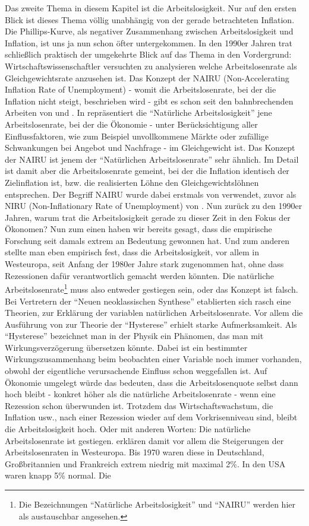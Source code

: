 Das zweite Thema in diesem Kapitel ist die Arbeitslosigkeit. Nur auf den ersten Blick ist dieses Thema völlig unabhängig von der gerade betrachteten Inflation. Die Phillips-Kurve, als negativer Zusammenhang zwischen Arbeitslosigkeit und Inflation, ist uns ja nun schon öfter untergekommen. In den 1990er Jahren trat schließlich praktisch der umgekehrte Blick auf das Thema in den Vordergrund: Wirtschaftswissenschaftler versuchten zu analysieren welche Arbeitslosenrate als Gleichgewichtsrate anzusehen ist. Das Konzept der NAIRU (Non-Accelerating Inflation Rate of Unemployment) - womit die Arbeitslosenrate, bei der die Inflation nicht steigt, beschrieben wird - gibt es schon seit den bahnbrechenden Arbeiten von \textcite{Friedman1968} und \textcite{Phelps1967}. In \textcite[S. 8]{Friedman1968} repräsentiert die "`Natürliche Arbeitslosigkeit"' jene Arbeitslosenrate, bei der die Ökonomie - unter Berücksichtigung aller Einflussfaktoren, wie zum Beispiel unvollkommene Märkte oder zufällige Schwankungen bei Angebot und Nachfrage - im Gleichgewicht ist. Das Konzept der NAIRU ist jenem der "`Natürlichen Arbeitslosenrate"' sehr ähnlich. Im Detail ist damit aber die Arbeitslosenrate gemeint, bei der die Inflation identisch der Zielinflation ist, bzw. die realisierten Löhne den Gleichgewichtslöhnen entsprechen. Der Begriff NAIRU wurde dabei erstmals von \textcite{Tobin1980} verwendet, zuvor als NIRU (Non-Inflationary Rate of Unemployment) von \textcite{Modigliani1975}. Nun zurück zu den 1990er Jahren, warum trat die Arbeitslosigkeit gerade zu dieser Zeit in den Fokus der Ökonomen? Nun zum einen haben wir bereits gesagt, dass die empirische Forschung seit damals extrem an Bedeutung gewonnen hat. Und zum anderen stellte man eben empirisch fest, dass die Arbeitslosigkeit, vor allem in Westeuropa, seit Anfang der 1980er Jahre stark zugenommen hat, ohne dass Rezessionen dafür verantwortlich gemacht werden könnten. Die natürliche Arbeitslosenrate\footnote{Die Bezeichnungen "`Natürliche Arbeitslosigkeit"' und "`NAIRU"' werden hier als austauschbar angesehen.} muss also entweder gestiegen sein, oder das Konzept ist falsch. Bei Vertretern der "`Neuen neoklassischen Synthese"' etablierten sich rasch eine Theorien, zur Erklärung der variablen natürlichen Arbeitslosenrate. Vor allem die Ausführung von \textcite{Blanchard1986} zur Theorie der "`Hysterese"' erhielt starke Aufmerksamkeit. Als "`Hysterese"' bezeichnet man in der Physik ein Phänomen, das man mit Wirkungsverzögerung übersetzen könnte. Dabei ist ein bestimmter Wirkungszusammenhang beim beobachten einer Variable noch immer vorhanden, obwohl der eigentliche verursachende Einfluss schon weggefallen ist. Auf Ökonomie umgelegt würde das bedeuten, dass die Arbeitslosenquote selbst dann hoch bleibt - konkret höher als die natürliche Arbeitslosenrate - wenn eine Rezession schon überwunden ist. Trotzdem das Wirtschaftswachstum, die Inflation usw., nach einer Rezession wieder auf dem Vorkrisenniveau sind, bleibt die Arbeitslosigkeit hoch. Oder mit anderen Worten: Die natürliche Arbeitslosenrate ist gestiegen. \textcite{Blanchard1986} erklären damit vor allem die Steigerungen der Arbeitslosenraten in Westeuropa. Bis 1970 waren diese in Deutschland, Großbritannien und Frankreich extrem niedrig mit maximal 2\%. In den USA waren knapp 5\% normal. Die 